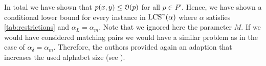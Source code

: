 In total we have shown that $p(x,y) \leq \mathcal{O}(p)$ for all $p \in P'$.
Hence, we have shown a conditional lower bound for every instance in $\text{LCS}^\gamma(\mathbb{\alpha})$ where $\mathbb{\alpha}$ satisfies \autoref{tab:restrictions} and $\alpha_L = \alpha_m$.
%
Note that we ignored here the parameter $M$.
If we would have considered matching pairs we would have a similar problem as in the case of $\alpha_\delta = \alpha_m$.
Therefore, the authors provided again an adaption that increases the used alphabet size (see \cite[section 9.2.3]{Bringman.2018}).